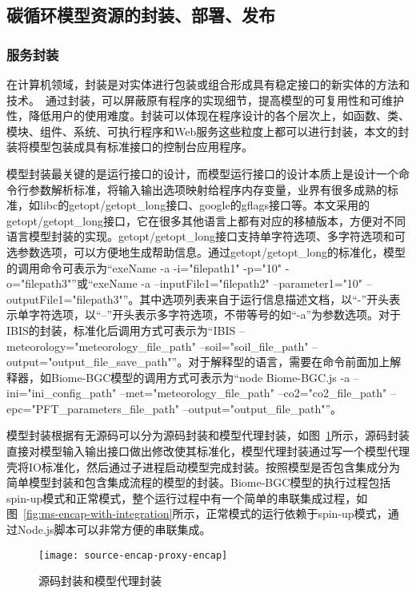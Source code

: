 \subsection{碳循环模型资源的封装、部署、发布}

\subsubsection{服务封装}
在计算机领域，封装是对实体进行包装或组合形成具有稳定接口的新实体的方法和技术。~\cite{胡迪2015地理模型的服务化封装方法研究}通过封装，可以屏蔽原有程序的实现细节，提高模型的可复用性和可维护性，降低用户的使用难度。封装可以体现在程序设计的各个层次上，如函数、类、模块、组件、系统、可执行程序和Web服务这些粒度上都可以进行封装，本文的封装将模型包装成具有标准接口的控制台应用程序。

模型封装最关键的是运行接口的设计，而模型运行接口的设计本质上是设计一个命令行参数解析标准，将输入输出选项映射给程序内存变量，业界有很多成熟的标准，如libc的getopt/getopt\_long接口、google的gflags接口等。本文采用的getopt/getopt\_long接口，它在很多其他语言上都有对应的移植版本，方便对不同语言模型封装的实现。getopt/getopt\_long接口支持单字符选项、多字符选项和可选参数选项，可以方便地生成帮助信息。通过getopt/getopt\_long的标准化，模型的调用命令可表示为“exeName -a -i="filepath1" -p="10" -o="filepath3"”或“exeName -a --inputFile1="filepath2" --parameter1="10" --outputFile1="filepath3"”。其中选项列表来自于运行信息描述文档，以“-”开头表示单字符选项，以“--”开头表示多字符选项，不带等号的如“-a”为参数选项。对于IBIS的封装，标准化后调用方式可表示为“IBIS --meteorology="meteorology\_file\_path" --soil="soil\_file\_path" --output="output\_file\_save\_path"”。对于解释型的语言，需要在命令前面加上解释器，如Biome-BGC模型的调用方式可表示为“node Biome-BGC.js -a --ini="ini\_config\_path" --met="meteorology\_file\_path" --co2="co2\_file\_path" --epc="PFT\_parameters\_file\_path" --output="output\_file\_path"”。

模型封装根据有无源码可以分为源码封装和模型代理封装，如图~\ref{fig:source-encap-proxy-encap}所示，源码封装直接对模型输入输出接口做出修改使其标准化，模型代理封装通过写一个模型代理壳将IO标准化，然后通过子进程启动模型完成封装。按照模型是否包含集成分为简单模型封装和包含集成流程的模型的封装。Biome-BGC模型的执行过程包括spin-up模式和正常模式，整个运行过程中有一个简单的串联集成过程，如图~\ref{fig:ms-encap-with-integration}所示，正常模式的运行依赖于spin-up模式，通过Node.js脚本可以非常方便的串联集成。

\begin{figure}[!htbp]
    \centering
    \texttt{[image: source-encap-proxy-encap]}
    \caption{源码封装和模型代理封装}
    \label{fig:source-encap-proxy-encap}
\end{figure}

